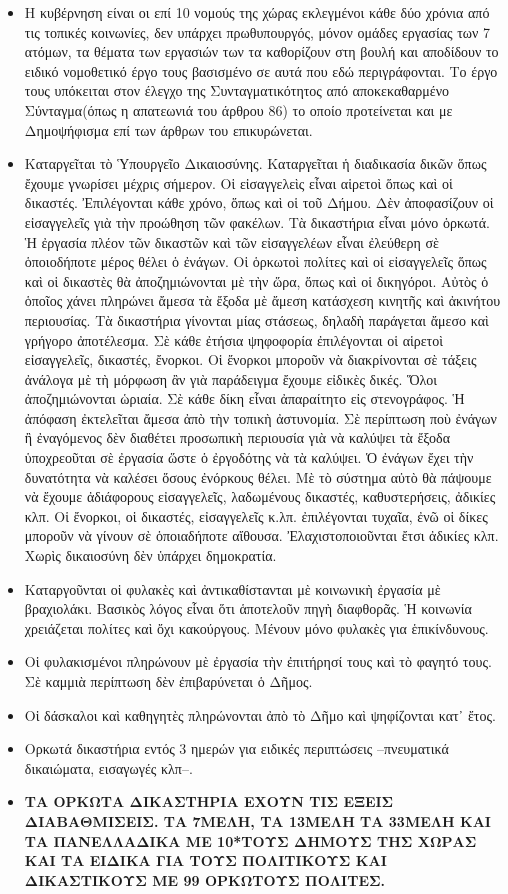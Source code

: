 \documentclass[a4paper]{article}
\begin{document}
\begin{itemize}
\item Η κυβέρνηση είναι οι επί 10 νομούς της χώρας εκλεγμένοι κάθε δύο χρόνια από τις τοπικές κοινωνίες, δεν υπάρχει πρωθυπουργός, μόνον ομάδες εργασίας των 7 ατόμων, τα θέματα των εργασιών των τα καθορίζουν στη βουλή και αποδίδουν το ειδικό νομοθετικό έργο τους βασισμένο σε αυτά που εδώ περιγράφονται. Το έργο τους υπόκειται στον έλεγχο της Συνταγματικότητος από αποκεκαθαρμένο Σύνταγμα(όπως η απατεωνιά του άρθρου 86) το οποίο προτείνεται και με Δημοψήφισμα επί των άρθρων του επικυρώνεται.
\item Καταργεῖται τὸ Ὑπουργεῖο Δικαιοσύνης. Καταργεῖται ἡ διαδικασία δικῶν ὅπως ἔχουμε γνωρίσει μέχρις σήμερον. Οἱ εἰσαγγελεὶς εἶναι αἱρετοὶ ὅπως καὶ οἱ δικαστές. Ἐπιλέγονται κάθε χρόνο, ὅπως καὶ οἱ τοῦ Δήμου. Δὲν ἀποφασίζουν οἱ εἰσαγγελεῖς γιὰ τὴν προώθηση τῶν φακέλων. Τὰ δικαστήρια εἶναι μόνο ὁρκωτά. Ἡ ἐργασία πλέον τῶν δικαστῶν καὶ τῶν εἰσαγγελέων εἶναι ἐλεύθερη σὲ ὁποιοδήποτε μέρος θέλει ὁ ἐνάγων. Οἱ ὁρκωτοὶ πολίτες καὶ οἱ εἰσαγγελεῖς ὅπως καὶ οἱ δικαστὲς θὰ ἀποζημιώνονται μὲ τὴν ὥρα, ὅπως καὶ οἱ δικηγόροι. Αὐτὸς ὁ ὁποῖος χάνει πληρώνει ἄμεσα τὰ ἔξοδα μὲ ἄμεση κατάσχεση κινητῆς καὶ ἀκινήτου περιουσίας. Τὰ δικαστήρια γίνονται μίας στάσεως, δηλαδὴ παράγεται ἄμεσο καὶ γρήγορο ἀποτέλεσμα. Σὲ κάθε ἐτήσια ψηφοφορία ἐπιλέγονται οἱ αἱρετοὶ εἰσαγγελεῖς, δικαστές, ἔνορκοι. Οἱ ἔνορκοι μποροῦν νὰ διακρίνονται σὲ τάξεις ἀνάλογα μὲ τὴ μόρφωση ἂν γιὰ παράδειγμα ἔχουμε εἰδικὲς δικές. Ὅλοι ἀποζημιώνονται ὡριαία. Σὲ κάθε δίκη εἶναι ἀπαραίτητο εἰς στενογράφος. Ἡ ἀπόφαση ἐκτελεῖται ἄμεσα ἀπὸ τὴν τοπικὴ ἀστυνομία. Σὲ περίπτωση ποὺ ἐνάγων ἢ ἐναγόμενος δὲν διαθέτει προσωπικὴ περιουσία γιὰ νὰ καλύψει τὰ ἔξοδα ὑποχρεοῦται σὲ ἐργασία ὥστε ὁ ἐργοδότης νὰ τὰ καλύψει. Ὁ ἐνάγων ἔχει τὴν δυνατότητα νὰ καλέσει ὅσους ἐνόρκους θέλει. Μὲ τὸ σύστημα αὐτὸ θὰ πάψουμε νὰ ἔχουμε ἀδιάφορους εἰσαγγελεῖς, λαδωμένους δικαστές, καθυστερήσεις, ἀδικίες κλπ. Οἱ ἔνορκοι, οἱ δικαστές, εἰσαγγελεῖς κ.λπ. ἐπιλέγονται τυχαῖα, ἐνῶ οἱ δίκες μποροῦν νὰ γίνουν σὲ ὁποιαδήποτε αἴθουσα. Ἐλαχιστοποιοῦνται ἔτσι ἀδικίες κλπ. Χωρὶς δικαιοσύνη δὲν ὑπάρχει δημοκρατία.
\item Καταργοῦνται οἱ φυλακὲς καὶ ἀντικαθίστανται μὲ κοινωνικὴ ἐργασία μὲ βραχιολάκι. Βασικὸς λόγος εἷναι ὅτι ἁποτελοῦν πηγὴ διαφθορᾶς. Ἡ κοινωνία χρειάζεται πολίτες καὶ ὄχι κακούργους. Μένουν μόνο φυλακὲς για ἑπικίνδυνους.
\item Οἱ φυλακισμένοι πληρώνουν μὲ ἐργασία τὴν ἐπιτήρησί τους καὶ τὸ φαγητό τους. Σὲ καμμιὰ περίπτωση δὲν ἐπιβαρύνεται ὁ Δῆμος.
\item Οἱ δάσκαλοι καὶ καθηγητὲς πληρώνονται ἀπὸ τὸ Δῆμο καὶ ψηφίζονται κατ᾿ ἔτος.
\item Ορκωτά δικαστήρια εντός 3 ημερών για ειδικές περιπτώσεις --πνευματικά δικαιώματα, εισαγωγές κλπ--.
\item \textbf{ΤΑ ΟΡΚΩΤΑ ΔΙΚΑΣΤΗΡΙΑ ΕΧΟΥΝ ΤΙΣ ΕΞΕΙΣ ΔΙΑΒΑΘΜΙΣΕΙΣ. ΤΑ 7ΜΕΛΗ, ΤΑ 13ΜΕΛΗ ΤΑ 33ΜΕΛΗ ΚΑΙ ΤΑ ΠΑΝΕΛΛΑΔΙΚΑ ΜΕ 10*ΤΟΥΣ ΔΗΜΟΥΣ ΤΗΣ ΧΩΡΑΣ ΚΑΙ ΤΑ ΕΙΔΙΚΑ ΓΙΑ ΤΟΥΣ ΠΟΛΙΤΙΚΟΥΣ ΚΑΙ ΔΙΚΑΣΤΙΚΟΥΣ ΜΕ 99 ΟΡΚΩΤΟΥΣ ΠΟΛΙΤΕΣ.} 


\end{itemize}
\end{document}
